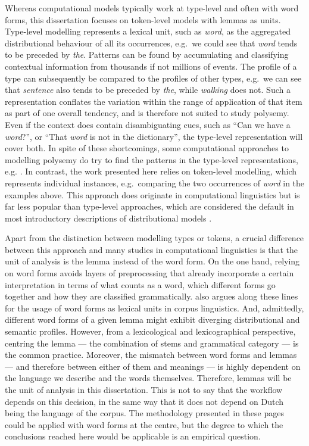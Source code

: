 \documentclass[
]{book}
\begin{document}
Whereas computational models typically work at type-level and often with word forms, this dissertation focuses on token-level models with lemmas as units.
Type-level modelling represents a lexical unit, such as \emph{word}, as the aggregated distributional behaviour of all its occurrences, e.g.~we could see that \emph{word} tends to be preceded by \emph{the}. Patterns can be found by accumulating and classifying contextual information from thousands if not millions of events. The profile of a type can subsequently be compared to the profiles of other types, e.g.~we can see that \emph{sentence} also tends to be preceded by \emph{the}, while \emph{walking} does not. Such a representation conflates the variation within the range of application of that item as part of one overall tendency, and is therefore not suited to study polysemy. Even if the context does contain disambiguating cues, such as ``Can we have a \emph{word}?'', or ``That \emph{word} is not in the dictionary'', the type-level representation will cover both. In spite of these shortcomings, some computational approaches to modelling polysemy do try to find the patterns in the type-level representations, e.g. \textcite{koptjevskaja-tamm.sahlgren_2014}. In contrast, the work presented here relies on token-level modelling, which represents individual instances, e.g.~comparing the two occurrences of \emph{word} in the examples above. This approach does originate in computational linguistics \autocite{schutze_1998} but is far less popular than type-level approaches, which are considered the default in most introductory descriptions of distributional models \autocite{lenci_2018,turney.pantel_2010,bolognesi_2020}.

Apart from the distinction between modelling types or tokens, a crucial difference between this approach and many studies in computational linguistics is that the unit of analysis is the lemma instead of the word form. On the one hand, relying on word forms avoids layers of preprocessing that already incorporate a certain interpretation in terms of what counts as a word, which different forms go together and how they are classified grammatically. \textcite{sinclair_1991} also argues along these lines for the usage of word forms as lexical units in corpus linguistics. And, admittedly, different word forms of a given lemma might exhibit diverging distributional and semantic profiles. However, from a lexicological and lexicographical perspective, centring the lemma --- the combination of stems and grammatical category --- is the common practice. Moreover, the mismatch between word forms and lemmas --- and therefore between either of them and meanings --- is highly dependent on the language we describe and the words themselves. Therefore, lemmas will be the unit of analysis in this dissertation. This is not to say that the workflow depends on this decision, in the same way that it does not depend on Dutch being the language of the corpus. The methodology presented in these pages could be applied with word forms at the centre, but the degree to which the conclusions reached here would be applicable is an empirical question.
\end{document}
